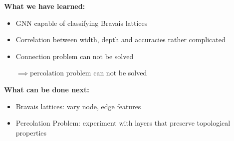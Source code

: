 \textbf{What we have learned:}
\begin{itemize}
    \item GNN capable of classifying Bravais lattices
    \item Correlation between width, depth and accuracies rather complicated
    \item Connection problem can not be solved\par$\implies$percolation problem can not be solved
\end{itemize}
\textbf{What can be done next:}
\begin{itemize}
    \item Bravais lattices: vary node, edge features
    \item Percolation Problem: experiment with layers that preserve topological properties
\end{itemize}